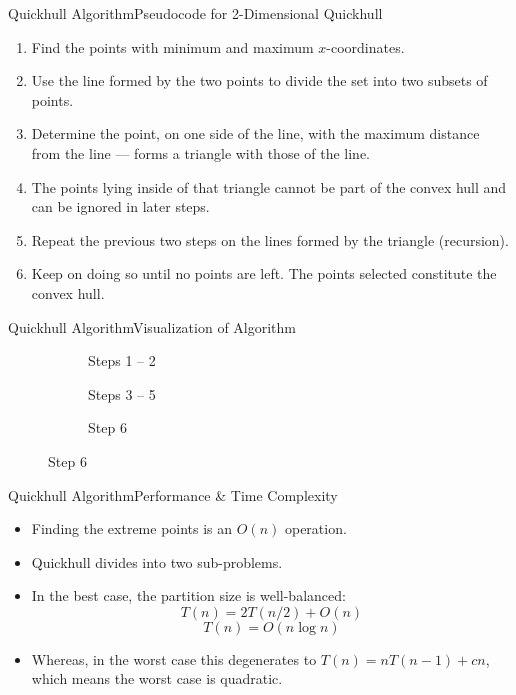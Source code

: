 \documentclass{beamer}
\begin{document}
\begin{frame}[t]{Quickhull Algorithm}{Pseudocode for 2-Dimensional Quickhull}
\begin{enumerate}
    \item Find the points with minimum and maximum $x$-coordinates. 
    \item Use the line formed by the two points to divide the set into two subsets of points. 
    \item Determine the point, on one side of the line, with the maximum distance from the line --- forms a triangle with those of the line. 
    \item The points lying inside of that triangle cannot be part of the convex hull and can be ignored in later steps. 
    \item Repeat the previous two steps on the lines formed by the triangle (recursion). 
    \item Keep on doing so until no points are left. The points selected constitute the convex hull.
\end{enumerate}
\end{frame}

\begin{frame}{Quickhull Algorithm}{Visualization of Algorithm}
    \begin{figure}
    \begin{subfigure}{0.45\textwidth}
    \centering
    \scalebox{0.5}{
    \def\svgwidth{\columnwidth}
    }
    \caption{\footnotesize Steps 1 -- 2}
    \end{subfigure}
    \begin{subfigure}{0.45\textwidth}
    \centering
    \scalebox{0.5}{
    \def\svgwidth{\columnwidth}
    }
    \caption{\footnotesize Steps 3 -- 5}
    \end{subfigure}
    \vfill 
    \begin{subfigure}[b!]{0.45\textwidth}
    \centering
    \scalebox{0.5}{
    \def\svgwidth{\columnwidth}
    }
    \caption{Step 6}
    \end{subfigure}
    \end{figure}
\end{frame}

\begin{frame}{Quickhull Algorithm}{Performance \& Time Complexity}
    \begin{itemize}
        \item Finding the extreme points is an $O(n)$ operation.
        \item Quickhull divides into two sub-problems. 
        \item In the best case, the partition size is well-balanced:
        \[T(n) = 2 T(n/2) + O(n)\]
        \[T(n) = O(n \log n)\]
        \item Whereas, in the worst case this degenerates to $T(n) = n T(n-1) + cn$,
        which means the worst case is quadratic. 
    \end{itemize}
\end{frame}
\end{document}
